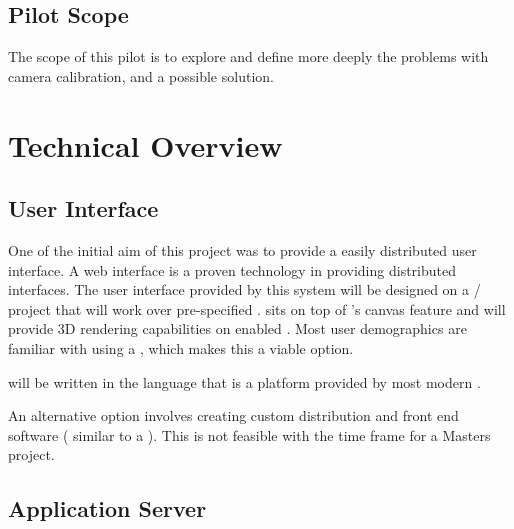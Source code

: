 \documentclass[11pt]{report}
\begin{document}
\subsection{Pilot Scope}
The scope of this pilot is to explore and define more deeply the problems with camera calibration, and a possible solution.  

\section{Technical Overview}

\subsection{User Interface}




One of the initial aim of this project was to provide a easily distributed user interface. A web interface is a proven technology in providing distributed interfaces. The user interface provided by this system will be designed on a / project that will work over pre-specified .  sits on top of 's canvas feature and will provide 3D rendering capabilities on enabled . Most user demographics are familiar with using a , which makes this a viable option. 

 will be written in the  language that is a platform provided by most modern . 

An alternative option involves creating custom distribution and front end software ( similar to a  ). This is not feasible with the time frame for a Masters project. 

\subsection{Application Server}
\end{document}
